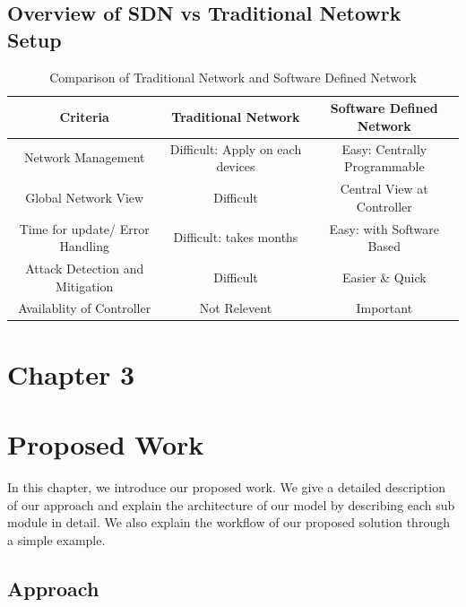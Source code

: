\documentclass[12pt,letterpaper]{article}
\begin{document}
    \subsection{Overview of SDN vs Traditional Netowrk Setup}

        \begin{table}[h]
            \centering
            \caption{Comparison of Traditional Network and Software Defined Network}
            \label{tab:network-comparison}
            \begin{tabular}{ccc}
            \toprule
            \textbf{Criteria} & \textbf{Traditional Network} & \textbf{Software Defined Network} \\
            \midrule
                Network Management & Difficult: Apply on each devices & Easy: Centrally Programmable \\
                Global Network View & Difficult & Central View at Controller \\
                Time for update/ Error Handling & Difficult: takes months & Easy: with Software Based \\
                Attack Detection and Mitigation & Difficult & Easier \& Quick \\
                Availablity of Controller & Not Relevent & Important \\
            \bottomrule
            \end{tabular}
        \end{table}
\clearpage    
    \newpage
    \section*{Chapter 3}
        \section{Proposed Work}
        In this chapter, we introduce our proposed work. We give a detailed description of our approach and explain the architecture of our model by describing each sub module in detail. We also explain the workflow of our proposed solution through a simple example.

        \subsection{Approach}
\end{document}
